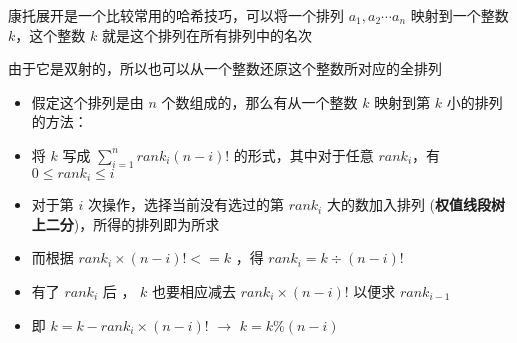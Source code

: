 \documentclass[E:/GsjzTle/main/main.tex]{subfiles}
\begin{document}
康托展开是一个比较常用的哈希技巧，可以将一个排列 \(a_1,a_2\cdots a_n\)
映射到一个整数 \(k\)，这个整数 \(k\) 就是这个排列在所有排列中的名次

由于它是双射的，所以也可以从一个整数还原这个整数所对应的全排列

\begin{itemize}
\item
  假定这个排列是由 \(n\) 个数组成的，那么有从一个整数 \(k\) 映射到第
  \(k\) 小的排列的方法：
\item
  将 \(k\) 写成 \(\sum^{n}_{i=1}rank_i(n-i)!\) 的形式，其中对于任意
  \(rank_i\)，有 \(0\leq rank_i\leq i\)
\item
  对于第 \(i\) 次操作，选择当前没有选过的第 \(rank_i\) 大的数加入排列
  (\textbf{权值线段树上二分})，所得的排列即为所求
\end{itemize}

\begin{itemize}
\item
  而根据 \(rank_i × (n-i)! <= k\) ，得 \(rank_i = k ÷ (n - i)!\)
\item
  有了 \(rank_i\) 后 ， \(k\) 也要相应减去 \(rank_i  × (n-i)!\) 以便求
  \(rank_{i-1}\)
\item
  即 \(k = k - rank_i × (n-i)!\) \(→\) \(k = k \% (n-i)\)
\end{itemize}
\end{document}
